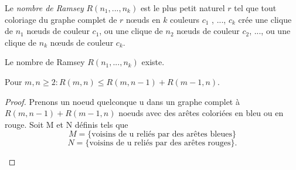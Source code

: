\begin{mydef} 
Le \emph{nombre de Ramsey} $R(n_1 , ..., n_k)$ est le plus petit naturel $r$ tel que tout coloriage du graphe complet de $r$ nœuds en $k$ couleurs $c_1$ , ..., $c_k$ crée une clique de $n_1$ nœuds de couleur $c_1$, ou une clique de $n_2$ nœuds de couleur $c_2$, ..., ou une clique de $n_k$ nœuds de couleur $c_k$.
\end{mydef}
  
\begin{mytheo} 
Le nombre de Ramsey $R(n_1,...,n_k)$ existe.
\end{mytheo}

\begin{mytheo} 
  Pour $m, n \geq 2: R(m, n) \leq R(m, n-1) + R(m-1, n)$.
  \begin{proof}
     Prenons un noeud quelconque u dans un graphe complet à $R(m,n-1) + R(m-1,n)$ noeuds avec des arêtes coloriées en bleu ou en rouge. Soit M et N définis tels que
     $$M = \{ \text{voisins de u reliés par des arêtes bleues}\}$$
     $$N = \{ \text{voisins de u reliés par des arêtes rouges}\}.$$
     
\begin{figure} [!h]
\end{figure}
\end{proof}
\end{mytheo}
